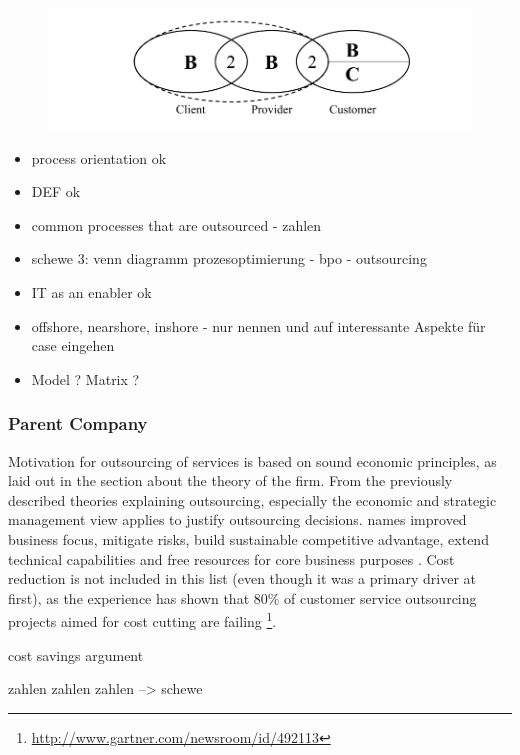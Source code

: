 		\begin{figure}[caption={BPO B2B2B/C Chain}, label={fig:bpochain}]
	{	\includegraphics[width=.8\textwidth]{figures/bpochain.pdf}}
	\end{figure}

			
		\begin{itemize}
			\item process orientation  ok
			\item DEF ok 
			\item common processes that are outsourced - zahlen
			\item schewe 3: venn diagramm prozesoptimierung - bpo - outsourcing
			
			\item IT as an enabler ok 
			\item offshore, nearshore, inshore - nur nennen und auf interessante Aspekte für case eingehen
			\item Model ? Matrix ? 
		\end{itemize}
	
		\subsubsection{Parent Company}
		Motivation for outsourcing of services is based on sound economic principles, as laid out in the section about the theory of the firm. From the previously described theories explaining outsourcing, especially the economic and strategic management view applies to justify outsourcing decisions. \citeauthor{bartell1998information} names improved business focus, mitigate risks, build sustainable competitive advantage, extend technical capabilities and free resources for core business purposes \cite{bartell1998information}. Cost reduction is not included in this list (even though it was a primary driver at first), as the experience has shown that 80\% of customer service outsourcing projects aimed for cost cutting are failing \footnote{\cf \url{http://www.gartner.com/newsroom/id/492113}}. 
		
		cost savings argument
		
		zahlen zahlen zahlen --> schewe
	
